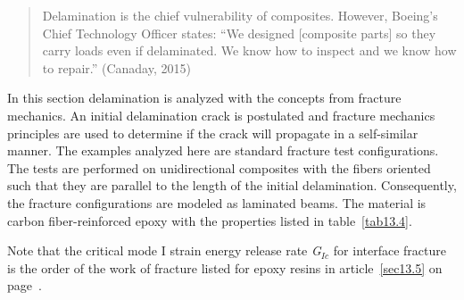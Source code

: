\documentclass{AeroStructure-ERJohnson}
\begin{document}
\begin{quote}%
Delamination is the chief vulnerability of composites. However, Boeing's Chief Technology Officer states: ``We designed [composite parts] so they carry loads even if delaminated. We know how to inspect and we know how to repair.'' (Canaday, 2015)
\end{quote}

In this section delamination is analyzed with the concepts from fracture mechanics. An initial delamination crack is postulated and fracture mechanics principles are used to determine if the crack will propagate in a self-similar manner. The examples analyzed here are standard fracture test configurations. The tests are performed on unidirectional composites with the fibers oriented such that they are parallel to the length of the initial delamination. Consequently, the fracture configurations are modeled as laminated beams. The material is carbon fiber-reinforced epoxy with the properties listed in table~\ref{tab13.4}.

\begin{table}[!h]
\vspace*{-1pc}
\end{table}

\noindent Note that the critical mode I strain energy release rate \textit{G}$_{\textit{Ic}}$ for interface fracture is the order of the work of fracture listed for epoxy resins in article~\ref{sec13.5} on page~\pageref{sec13.5}\vadjust{\vspace*{6pt}\pagebreak}.
\end{document}
